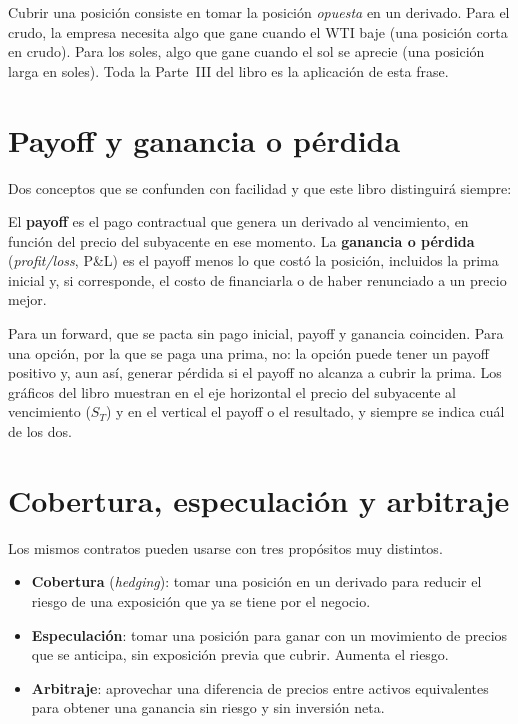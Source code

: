 Cubrir una posición consiste en tomar la posición \emph{opuesta} en un derivado. Para el crudo, la empresa necesita algo que gane cuando el WTI baje (una posición corta en crudo). Para los soles, algo que gane cuando el sol se aprecie (una posición larga en soles). Toda la Parte~III del libro es la aplicación de esta frase.

\section{Payoff y ganancia o pérdida}

Dos conceptos que se confunden con facilidad y que este libro distinguirá siempre:

\begin{definicion}
El \textbf{payoff} es el pago contractual que genera un derivado al vencimiento, en función del precio del subyacente en ese momento. La \textbf{ganancia o pérdida} (\emph{profit/loss}, P\&L) es el payoff menos lo que costó la posición, incluidos la prima inicial y, si corresponde, el costo de financiarla o de haber renunciado a un precio mejor.
\end{definicion}

Para un forward, que se pacta sin pago inicial, payoff y ganancia coinciden. Para una opción, por la que se paga una prima, no: la opción puede tener un payoff positivo y, aun así, generar pérdida si el payoff no alcanza a cubrir la prima. Los gráficos del libro muestran en el eje horizontal el precio del subyacente al vencimiento ($S_T$) y en el vertical el payoff o el resultado, y siempre se indica cuál de los dos.

\section{Cobertura, especulación y arbitraje}

Los mismos contratos pueden usarse con tres propósitos muy distintos.

\begin{definicion}
\begin{itemize}
\item \textbf{Cobertura} (\emph{hedging}): tomar una posición en un derivado para reducir el riesgo de una exposición que ya se tiene por el negocio.
\item \textbf{Especulación}: tomar una posición para ganar con un movimiento de precios que se anticipa, sin exposición previa que cubrir. Aumenta el riesgo.
\item \textbf{Arbitraje}: aprovechar una diferencia de precios entre activos equivalentes para obtener una ganancia sin riesgo y sin inversión neta.
\end{itemize}
\end{definicion}


